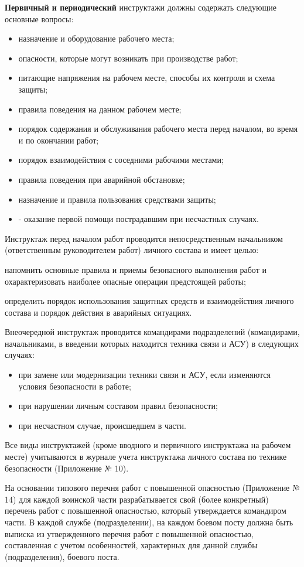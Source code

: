 \documentclass[12pt,a4paper]{report}
\begin{document}
\textbf{Первичный и периодический} инструктажи должны содержать следующие основные вопросы:
\begin{itemize}
\item назначение и оборудование рабочего места;
\item опасности, которые могут возникать при производстве работ;
\item питающие напряжения на рабочем месте, способы их контроля и схема защиты;
\item правила поведения на данном рабочем месте;
\item порядок содержания и обслуживания рабочего места перед началом, во время и по окончании работ;
\item порядок взаимодействия с соседними рабочими местами;
\item правила поведения при аварийной обстановке;
\item назначение и правила пользования средствами защиты;
\item - оказание первой помощи пострадавшим при несчастных случаях.
\end{itemize}
Инструктаж перед началом работ проводится непосредственным начальником (ответственным руководителем работ) личного состава и имеет целью:

напомнить основные правила и приемы безопасного выполнения работ и охарактеризовать наиболее опасные операции предстоящей работы;

определить порядок использования защитных средств и взаимодействия личного состава и порядок действия в аварийных ситуациях.

Внеочередной инструктаж проводится командирами подразделений (командирами, начальниками, в введении которых находится техника связи и АСУ) в следующих случаях:
\begin{itemize}
\item при замене или модернизации техники связи и АСУ, если изменяются условия безопасности в работе;

\item при нарушении личным составом правил безопасности;

\item при несчастном случае, происшедшем в части.
\end{itemize}
Все виды инструктажей (кроме вводного и первичного инструктажа на рабочем месте) учитываются в журнале учета инструктажа личного состава по технике безопасности (Приложение № 10).

На основании типового перечня работ с повышенной опасностью (Приложение № 14) для каждой воинской части разрабатывается свой (более конкретный) перечень работ с повышенной опасностью, который утверждается командиром части. В каждой службе (подразделении), на каждом боевом посту должна быть выписка из утвержденного перечня работ с повышенной опасностью, составленная с учетом особенностей, характерных для данной службы (подразделения), боевого поста.
\end{document}
